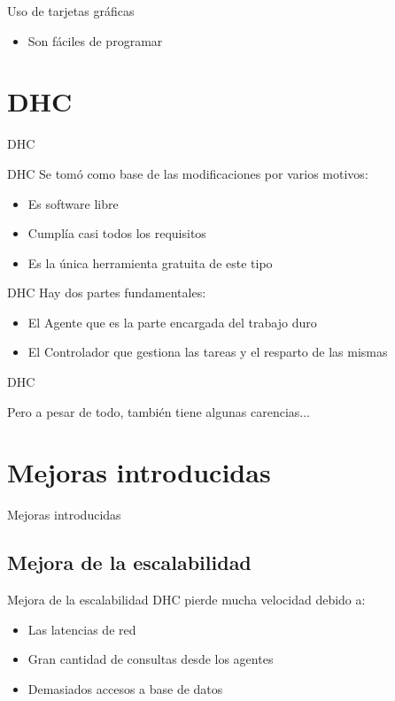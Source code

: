 \documentclass[12pt]{beamer}
\newcommand{\mysection}[1]{\begin{frame}{}\begin{center}\Huge #1\end{center}\end{frame}}
\begin{document}
\begin{frame}{Uso de tarjetas gráficas}
\begin{itemize}
		\item Son fáciles de programar
			\only<4>{
				\testcode
			}
	\end{itemize}
\end{frame}

\section{DHC}
\mysection{DHC}
\begin{frame}{DHC}
	Se tomó como base de las modificaciones por varios motivos:
	\pause
	\begin{itemize}
		\item Es software libre
		\item Cumplía casi todos los requisitos
		\item Es la única herramienta gratuita de este tipo
	\end{itemize}
\end{frame}

\begin{frame}{DHC}
	Hay dos partes fundamentales:
	\pause
	\begin{itemize}
		\item El \color{green}Agente \color{white}que es la parte encargada del trabajo duro
		\item El \color{green}Controlador \color{white}que gestiona las tareas y el resparto de las mismas
	\end{itemize}
\end{frame}
\begin{frame}{DHC}
	\begin{center}
		Pero a pesar de todo, también tiene algunas carencias...
	\end{center}
\end{frame}


\section{Mejoras introducidas}

\mysection{Mejoras introducidas}

\subsection{Mejora de la escalabilidad}
\begin{frame}{Mejora de la escalabilidad}
	DHC pierde mucha velocidad debido a:
	\pause
	\begin{itemize}
		\item Las latencias de red
		\item Gran cantidad de consultas desde los agentes
		\item Demasiados accesos a base de datos
	\end{itemize}
\end{frame}
\end{document}
